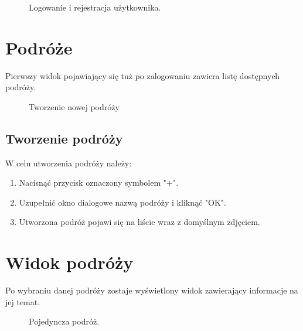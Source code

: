 \begin{figure}[h]

\centering
\null\hfill
{}
\hfill
{}
\hfill\null

\caption{Logowanie i rejestracja użytkownika.}
\label{fig:podrecznik1}
\end{figure}
\FloatBarrier

\section{Podróże}
Pierwszy widok pojawiający się tuż po zalogowaniu zawiera listę dostępnych podróży.

\begin{figure}[h]

\centering
\null\hfill
{}
\hfill
{}
\hfill
{}
\hfill\null

\caption{Tworzenie nowej podróży}
\label{fig:podrecznik2}
\end{figure}
\FloatBarrier

\subsection{Tworzenie podróży}
W celu utworzenia podróży należy:
\begin{enumerate}
\item Nacisnąć przycisk oznaczony symbolem "+".
\item Uzupełnić okno dialogowe nazwą podróży i kliknąć "OK".
\item Utworzona podróż pojawi się na liście wraz z domyślnym zdjęciem.
\end{enumerate}


\section{Widok podróży}
Po wybraniu danej podróży zostaje wyświetlony widok zawierający informacje na jej temat.

\begin{figure}[h]
\centering

\centering
\null\hfill
{}
\hfill
{}
\hfill\null

\caption{Pojedyncza podróż.}
\label{fig:podrecznik3}
\end{figure}
\FloatBarrier
